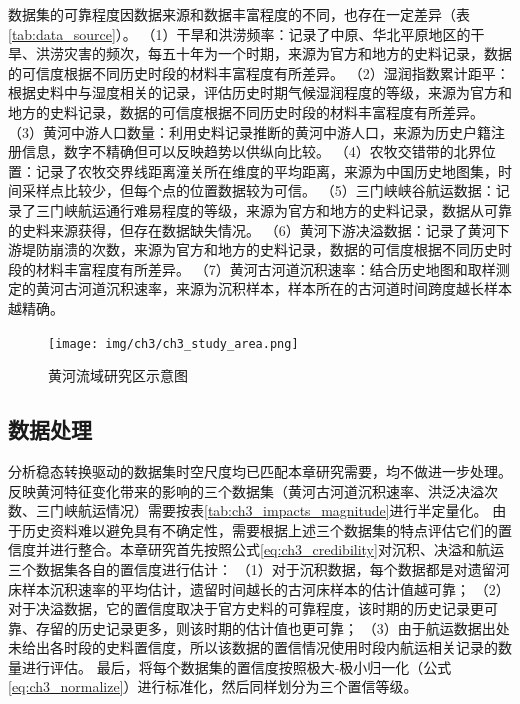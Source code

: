 数据集的可靠程度因数据来源和数据丰富程度的不同，也存在一定差异（表\ref{tab:data_source}）。
（1）干旱和洪涝频率：记录了中原、华北平原地区的干旱、洪涝灾害的频次，每五十年为一个时期，来源为官方和地方的史料记录，数据的可信度根据不同历史时段的材料丰富程度有所差异。
（2）湿润指数累计距平：根据史料中与湿度相关的记录，评估历史时期气候湿润程度的等级，来源为官方和地方的史料记录，数据的可信度根据不同历史时段的材料丰富程度有所差异。
（3）黄河中游人口数量：利用史料记录推断的黄河中游人口，来源为历史户籍注册信息，数字不精确但可以反映趋势以供纵向比较。
（4）农牧交错带的北界位置：记录了农牧交界线距离潼关所在维度的平均距离，来源为中国历史地图集，时间采样点比较少，但每个点的位置数据较为可信。
（5）三门峡峡谷航运数据：记录了三门峡航运通行难易程度的等级，来源为官方和地方的史料记录，数据从可靠的史料来源获得，但存在数据缺失情况。
（6）黄河下游决溢数据：记录了黄河下游堤防崩溃的次数，来源为官方和地方的史料记录，数据的可信度根据不同历史时段的材料丰富程度有所差异。
（7）黄河古河道沉积速率：结合历史地图和取样测定的黄河古河道沉积速率，来源为沉积样本，样本所在的古河道时间跨度越长样本越精确。

\begin{figure}[htb] %
    \texttt{[image: img/ch3/ch3\_study\_area.png]}
    \caption{黄河流域研究区示意图}\label{ch3:fig:study_area}
\end{figure}



\subsection{数据处理}

分析稳态转换驱动的数据集时空尺度均已匹配本章研究需要，均不做进一步处理。
反映黄河特征变化带来的影响的三个数据集（黄河古河道沉积速率、洪泛决溢次数、三门峡航运情况）需要按表\ref{tab:ch3_impacts_magnitude}进行半定量化。
由于历史资料难以避免具有不确定性，需要根据上述三个数据集的特点评估它们的置信度并进行整合。本章研究首先按照公式\ref{eq:ch3_credibility}对沉积、决溢和航运三个数据集各自的置信度进行估计：
（1）对于沉积数据，每个数据都是对遗留河床样本沉积速率的平均估计，遗留时间越长的古河床样本的估计值越可靠；
（2）对于决溢数据，它的置信度取决于官方史料的可靠程度，该时期的历史记录更可靠、存留的历史记录更多，则该时期的估计值也更可靠；
（3）由于航运数据出处未给出各时段的史料置信度，所以该数据的置信情况使用时段内航运相关记录的数量进行评估。
最后，将每个数据集的置信度按照极大-极小归一化（公式\ref{eq:ch3_normalize}）进行标准化，然后同样划分为三个置信等级。

